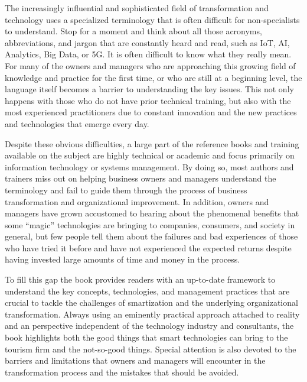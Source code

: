 \documentclass[
  letterpaper,
  DIV=11,
  numbers=noendperiod]{scrreprt}
\begin{document}
The increasingly influential and sophisticated field of transformation
and technology uses a specialized terminology that is often difficult
for non-specialists to understand. Stop for a moment and think about all
those acronyms, abbreviations, and jargon that are constantly heard and
read, such as IoT, AI, Analytics, Big Data, or 5G. It is often difficult
to know what they really mean. For many of the owners and managers who
are approaching this growing field of knowledge and practice for the
first time, or who are still at a beginning level, the language itself
becomes a barrier to understanding the key issues. This not only happens
with those who do not have prior technical training, but also with the
most experienced practitioners due to constant innovation and the new
practices and technologies that emerge every day.

Despite these obvious difficulties, a large part of the reference books
and training available on the subject are highly technical or academic
and focus primarily on information technology or systems management. By
doing so, most authors and trainers miss out on helping business owners
and managers understand the terminology and fail to guide them through
the process of business transformation and organizational improvement.
In addition, owners and managers have grown accustomed to hearing about
the phenomenal benefits that some ``magic'' technologies are bringing to
companies, consumers, and society in general, but few people tell them
about the failures and bad experiences of those who have tried it before
and have not experienced the expected returns despite having invested
large amounts of time and money in the process.

To fill this gap the book provides readers with an up-to-date framework
to understand the key concepts, technologies, and management practices
that are crucial to tackle the challenges of smartization and the
underlying organizational transformation. Always using an eminently
practical approach attached to reality and an perspective independent of
the technology industry and consultants, the book highlights both the
good things that smart technologies can bring to the tourism firm and
the not-so-good things. Special attention is also devoted to the
barriers and limitations that owners and managers will encounter in the
transformation process and the mistakes that should be avoided.
\end{document}
